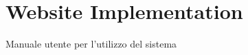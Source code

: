 \chapter{Website Implementation}
\label{appendixD}
\thispagestyle{empty}

\noindent Manuale utente per l'utilizzo del sistema